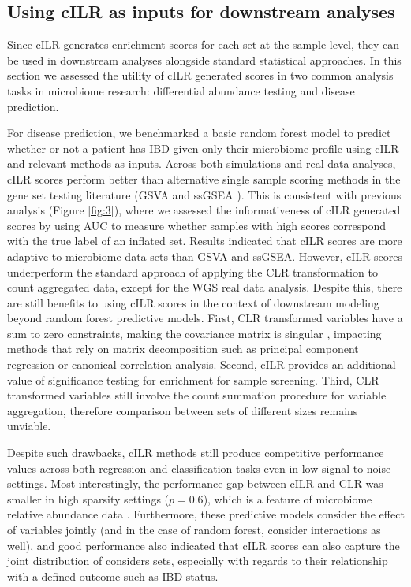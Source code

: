 \documentclass{article}
\begin{document}
\subsection*{Using cILR as inputs for downstream analyses}
Since cILR generates enrichment scores for each set at the sample level, they can be used in downstream analyses alongside standard statistical approaches. In this section we assessed the utility of cILR generated scores in two common analysis tasks in microbiome research: differential abundance testing and disease prediction.

For disease prediction, we benchmarked a basic random forest model \cite{breiman2001} to predict whether or not a patient has IBD given only their microbiome profile using cILR and relevant methods as inputs. Across both simulations and real data analyses, cILR scores perform better than alternative single sample scoring methods in the gene set testing literature (GSVA \cite{hanzelmann2013} and ssGSEA \cite{barbie2009}). This is consistent with previous analysis (Figure \ref{fig:3}), where we assessed the informativeness of cILR generated scores by using AUC to measure whether samples with high scores correspond with the true label of an inflated set. Results indicated that cILR scores are more adaptive to microbiome data sets than GSVA and ssGSEA. However, cILR scores underperform the standard approach of applying the CLR transformation to count aggregated data, except for the WGS real data analysis. Despite this, there are still benefits to using cILR scores in the context of downstream modeling beyond random forest predictive models. First, CLR transformed variables have a sum to zero constraints, making the covariance matrix is singular \cite{gloor2017}, impacting methods that rely on matrix decomposition such as principal component regression or canonical correlation analysis. Second, cILR provides an additional value of significance testing for enrichment for sample screening. Third, CLR transformed variables still involve the count summation procedure for variable aggregation, therefore comparison between sets of different sizes remains unviable.       

Despite such drawbacks, cILR methods still produce competitive performance values across both regression and classification tasks even in low signal-to-noise settings. Most interestingly, the performance gap between cILR and CLR was smaller in high sparsity settings ($p = 0.6$), which is a feature of microbiome relative abundance data \cite{li2019}. Furthermore, these predictive models consider the effect of variables jointly (and in the case of random forest, consider interactions as well), and good performance also indicated that cILR scores can also capture the joint distribution of considers sets, especially with regards to their relationship with a defined outcome such as IBD status.   
\end{document}
